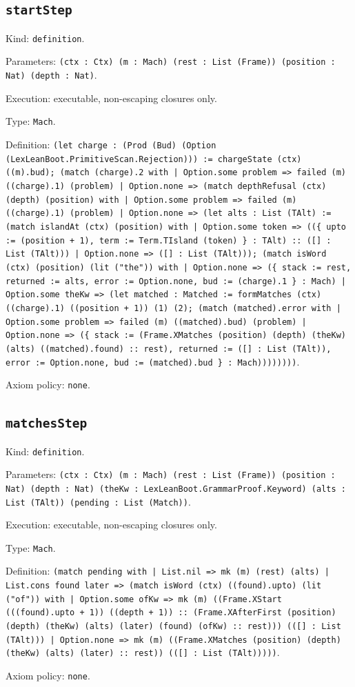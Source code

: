 \documentclass[11pt]{article}
\begin{document}
\subsection*{\texttt{startStep}}
\noindent Kind: \texttt{definition}.\par
\noindent Parameters: \texttt{(ctx : Ctx) (m : Mach) (rest : List (Frame)) (position : Nat) (depth : Nat)}.\par
\noindent Execution: executable, non-escaping closures only.\par
\noindent Type: \texttt{Mach}.\par
\noindent Definition: \texttt{(let charge : (Prod (Bud) (Option (LexLeanBoot.PrimitiveScan.Rejection))) := chargeState (ctx) ((m).bud); (match (charge).2 with | Option.some problem => failed (m) ((charge).1) (problem) | Option.none => (match depthRefusal (ctx) (depth) (position) with | Option.some problem => failed (m) ((charge).1) (problem) | Option.none => (let alts : List (TAlt) := (match islandAt (ctx) (position) with | Option.some token => ((\{ upto := (position + 1), term := Term.TIsland (token) \} : TAlt) :: ([] : List (TAlt))) | Option.none => ([] : List (TAlt))); (match isWord (ctx) (position) (lit ("the")) with | Option.none => (\{ stack := rest, returned := alts, error := Option.none, bud := (charge).1 \} : Mach) | Option.some theKw => (let matched : Matched := formMatches (ctx) ((charge).1) ((position + 1)) (1) (2); (match (matched).error with | Option.some problem => failed (m) ((matched).bud) (problem) | Option.none => (\{ stack := (Frame.XMatches (position) (depth) (theKw) (alts) ((matched).found) :: rest), returned := ([] : List (TAlt)), error := Option.none, bud := (matched).bud \} : Mach))))))))}.\par
\noindent Axiom policy: \texttt{none}.\par
\subsection*{\texttt{matchesStep}}
\noindent Kind: \texttt{definition}.\par
\noindent Parameters: \texttt{(ctx : Ctx) (m : Mach) (rest : List (Frame)) (position : Nat) (depth : Nat) (theKw : LexLeanBoot.GrammarProof.Keyword) (alts : List (TAlt)) (pending : List (Match))}.\par
\noindent Execution: executable, non-escaping closures only.\par
\noindent Type: \texttt{Mach}.\par
\noindent Definition: \texttt{(match pending with | List.nil => mk (m) (rest) (alts) | List.cons found later => (match isWord (ctx) ((found).upto) (lit ("of")) with | Option.some ofKw => mk (m) ((Frame.XStart (((found).upto + 1)) ((depth + 1)) :: (Frame.XAfterFirst (position) (depth) (theKw) (alts) (later) (found) (ofKw) :: rest))) (([] : List (TAlt))) | Option.none => mk (m) ((Frame.XMatches (position) (depth) (theKw) (alts) (later) :: rest)) (([] : List (TAlt)))))}.\par
\noindent Axiom policy: \texttt{none}.\par
\end{document}

